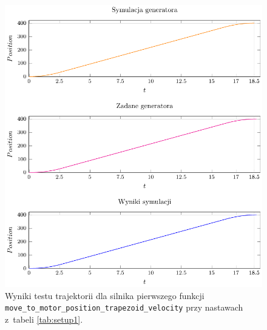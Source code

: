 \documentclass[a4paper, 12pt]{article}
\begin{document}
	\begin{figure}[H]
		\centering
		\includegraphics[scale=1.2]{raport_graphs/simpMPV.pdf}
		\caption{Wyniki testu trajektorii dla silnika pierwszego funkcji \texttt{move\_to\_motor\_position\_trapezoid\_velocity} przy nastawach z~tabeli \ref{tab:setup1}.}
		\label{fig:simpMPV}
	\end{figure}
\end{document}
